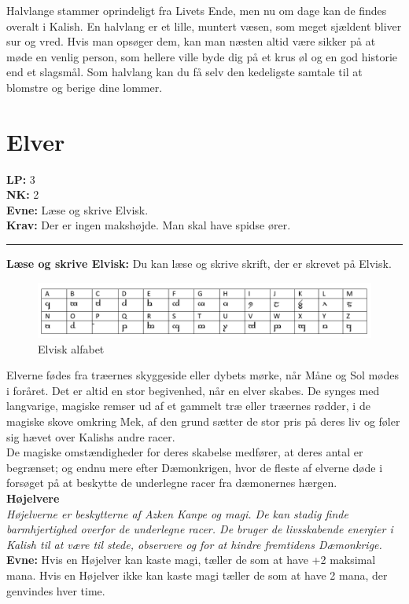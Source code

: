 Halvlange stammer oprindeligt fra Livets Ende, men nu om dage kan de findes overalt i Kalish. En halvlang er et lille, muntert væsen, som meget sjældent bliver sur og vred. Hvis man opsøger dem, kan man næsten altid være sikker på at møde en venlig person, som hellere ville byde dig på et krus øl og en god historie end et slagsmål. Som halvlang kan du få selv den kedeligste samtale til at blomstre og berige dine lommer.

\section*{Elver}
\begin{race*}[Elvere]
\textbf{LP:} 3\\ 
\textbf{NK:} 2\\ 
\textbf{Evne:} Læse og skrive Elvisk.\\
\textbf{Krav:} Der er ingen makshøjde. Man skal have spidse ører.\\
\rule{\textwidth}{0.4pt}
\textbf{Læse og skrive Elvisk:} Du kan læse og skrive skrift, der er skrevet på Elvisk.\\
\end{race*}

\begin{figure}[H]
    \centering
    \includegraphics[width=1\textwidth]{setup/Alfabeter/Elvisk alfabet.pdf}
    \caption{Elvisk alfabet}
\end{figure}

Elverne fødes fra træernes skyggeside eller dybets mørke, når Måne og Sol mødes i foråret. Det er altid en stor begivenhed, når en elver skabes. De synges med langvarige, magiske remser ud af et gammelt træ eller træernes rødder, i de magiske skove omkring Mek, af den grund sætter de stor pris på deres liv og føler sig hævet over Kalishs andre racer.\\
De magiske omstændigheder for deres skabelse medfører, at deres antal er begrænset; og endnu mere efter Dæmonkrigen, hvor de fleste af elverne døde i forsøget på at beskytte de underlegne racer fra dæmonernes hærgen.\\

\textbf{Højelvere}\\
\textit{Højelverne er beskytterne af Azken Kanpe og magi. De kan stadig finde barmhjertighed overfor de underlegne racer. De bruger de livsskabende energier i Kalish til at være til stede, observere og for at hindre fremtidens Dæmonkrige.}\\
\textbf{Evne:} Hvis en Højelver kan kaste magi, tæller de som at have +2 maksimal mana. Hvis en Højelver ikke kan kaste magi tæller de som at have 2 mana, der genvindes hver time.\\

